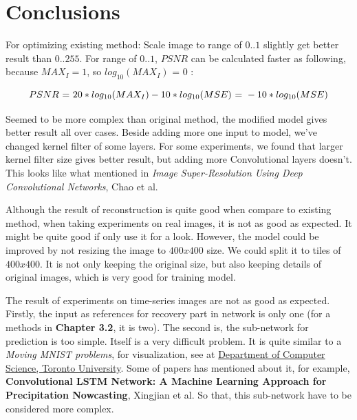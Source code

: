 \section{Conclusions}

For optimizing existing method: Scale image to range of $0..1$ slightly get better result than $0..255$. For range of $0..1$, $PSNR$ can be calculated faster as following, because $MAX_I = 1$, so $log_{10}(MAX_I) \textrm{ = } 0$ :

\begin{equation}
\centering
PSNR \textrm{ = } 20 * log_{10}(MAX_I) - 10 * log_{10}(MSE) \textrm{ = } -10 * log_{10}(MSE)
\end{equation}

Seemed to be more complex than original method, the modified model gives better result all over cases. Beside adding more one input to model, we've changed kernel filter of some layers. For some experiments, we found that larger kernel filter size gives better result, but adding more Convolutional layers doesn't. This looks like what mentioned in \textit{Image Super-Resolution Using Deep Convolutional Networks}, Chao et al.

Although the result of reconstruction is quite good when compare to existing method, when taking experiments on real images, it is not as good as expected. It might be quite good if only use it for a look. However, the model could be improved by not resizing the image to $400x400$ size. We could split it to tiles of $400x400$. It is not only keeping the original size, but also keeping details of original images, which is very good for training model.

The result of experiments on time-series images are not as good as expected. Firstly, the input as references for recovery part in network is only one (for a methods in \textbf{Chapter 3.2}, it is two). The second is, the sub-network for prediction is too simple. Itself is a very difficult problem. It is quite similar to a \textit{Moving MNIST problems}, for visualization, see at \href{http://www.cs.toronto.edu/~nitish/unsupervised_video/}{Department of Computer Science, Toronto University}. Some of papers has mentioned about it, for example, \textbf{Convolutional LSTM Network: A Machine Learning Approach for Precipitation Nowcasting}, Xingjian et al. So that, this sub-network have to be considered more complex. 